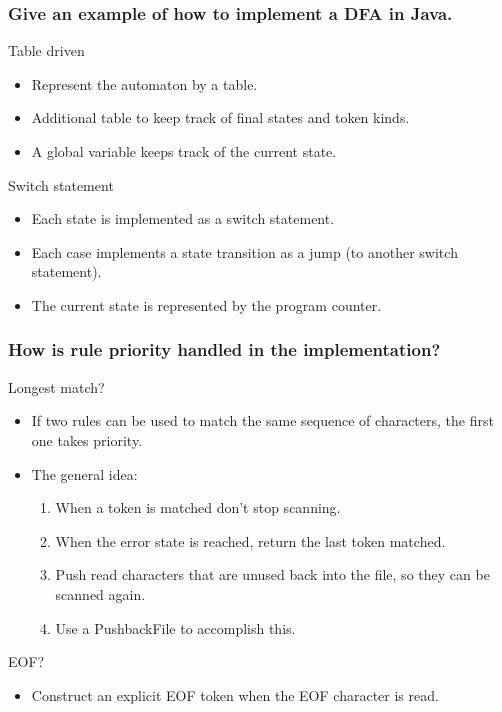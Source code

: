 \documentclass[11pt]{beamer}
\begin{document}
\begin{frame}
\frametitle{Give an example of how to implement a DFA in Java. }

\begin{block}{Table driven}
\begin{itemize}
\item Represent the automaton by a table.
\item Additional table to keep track of final states and token kinds.
\item A global variable keeps track of the current state.
\end{itemize}
\end{block}

\begin{block}{Switch statement}
\begin{itemize}
\item Each state is implemented as a switch statement.
\item Each case implements a state transition as a jump (to another switch statement).
\item The current state is represented by the program counter. 
\end{itemize}
\end{block}

\end{frame}


\begin{frame}
\frametitle{How is rule priority handled in the implementation?}
\begin{block}{Longest match?}
\begin{itemize}
\item If two rules can be used to match the same sequence of characters, the first one takes priority.
\item The general idea:
\begin{enumerate}
\item When a token is matched don't stop scanning.
\item When the error state is reached, return the last token matched.
\item Push read characters that are unused back into the file, so they can be scanned again.
\item Use a PushbackFile to accomplish this.
\end{enumerate}
\end{itemize}
\end{block}

\begin{block}{EOF?}
\begin{itemize}
\item Construct an explicit EOF token when the EOF character is read.
\end{itemize}
\end{block}

\end{frame}
\end{document}
